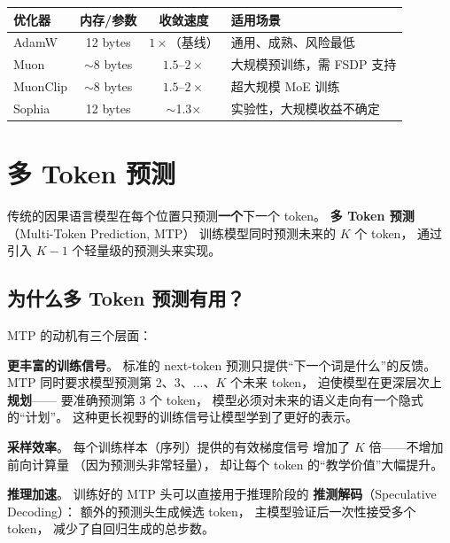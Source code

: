 \begin{keybox}[优化器选择指南（2026 年）]
\begin{center}
\begin{tabular}{lccl}
  \hline
  \textbf{优化器} & \textbf{内存/参数} & \textbf{收敛速度}
  & \textbf{适用场景} \\
  \hline
  AdamW & 12 bytes & $1\times$（基线） & 通用、成熟、风险最低 \\
  Muon & $\sim$8 bytes & $1.5$--$2\times$ & 大规模预训练，需 FSDP 支持 \\
  MuonClip & $\sim$8 bytes & $1.5$--$2\times$ & 超大规模 MoE 训练 \\
  Sophia & 12 bytes & $\sim$1.3$\times$ & 实验性，大规模收益不确定 \\
  \hline
\end{tabular}
\end{center}
\end{keybox}

\section{多 Token 预测}
\label{sec:mtp}

传统的因果语言模型在每个位置只预测\textbf{一个}下一个 token。
\textbf{多 Token 预测}（Multi-Token Prediction, MTP）%
训练模型同时预测未来的 $K$ 个 token，
通过引入 $K-1$ 个轻量级的预测头来实现。

\subsection{为什么多 Token 预测有用？}

MTP 的动机有三个层面：

\textbf{更丰富的训练信号}。
标准的 next-token 预测只提供``下一个词是什么''的反馈。
MTP 同时要求模型预测第 2、3、...、$K$ 个未来 token，
迫使模型在更深层次上\textbf{规划}——
要准确预测第 3 个 token，
模型必须对未来的语义走向有一个隐式的``计划''。
这种更长视野的训练信号让模型学到了更好的表示。

\textbf{采样效率}。
每个训练样本（序列）提供的有效梯度信号
增加了 $K$ 倍——不增加前向计算量
（因为预测头非常轻量），
却让每个 token 的``教学价值''大幅提升。

\textbf{推理加速}。
训练好的 MTP 头可以直接用于推理阶段的
\textbf{推测解码}（Speculative Decoding）：
额外的预测头生成候选 token，
主模型验证后一次性接受多个 token，
减少了自回归生成的总步数。

